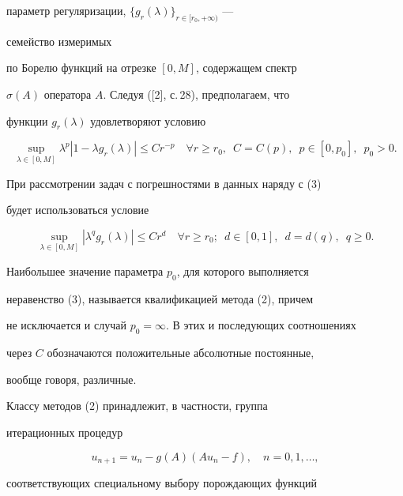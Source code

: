параметр регуляризации, $\{g_r(\lambda)\}_{r\in[r_0,+\infty)}$ --- 


семейство измеримых 


по Борелю функций на отрезке $[0,M]$, содержащем спектр 


$\sigma(A)$ оператора $A$. Следуя ([2], с.\,28), предполагаем, что 


функции $g_r(\lambda)$ удовлетворяют условию 


\begin{equation} 


\sup_{\lambda\in[0,M]}\lambda^p|1-\lambda g_r(\lambda)| 


\le C r^{-p}\quad \forall r\ge r_0, 


\ \;C=C(p),\ \; p\in[0,p_0],\ \;p_0>0. 


\end{equation} 


При рассмотрении задач с погрешностями в данных наряду с (3) 


будет использоваться условие 


\begin{equation} 


\sup_{\lambda\in[0,M]}|\lambda^q g_r(\lambda)| 


\le C r^d\quad \forall r\ge r_0; 


\ \; d\in[0,1],\ \; d=d(q),\ \; q\ge0. 


\end{equation} 


Наибольшее значение параметра $p_0$, для которого выполняется 


неравенство (3), называется квалификацией метода (2), причем 


не исключается и случай $p_0=\infty$. В этих и последующих соотношениях 


через $C$ обозначаются положительные абсолютные постоянные, 


вообще говоря, различные. 


 


Классу методов (2) принадлежит, в частности, группа 


итерационных процедур 


\begin{equation} 


u_{n+1}=u_n-g(A)(A u_n-f),\quad n=0,1,\dotsc, 


\end{equation} 


соответствующих специальному выбору порождающих функций 


